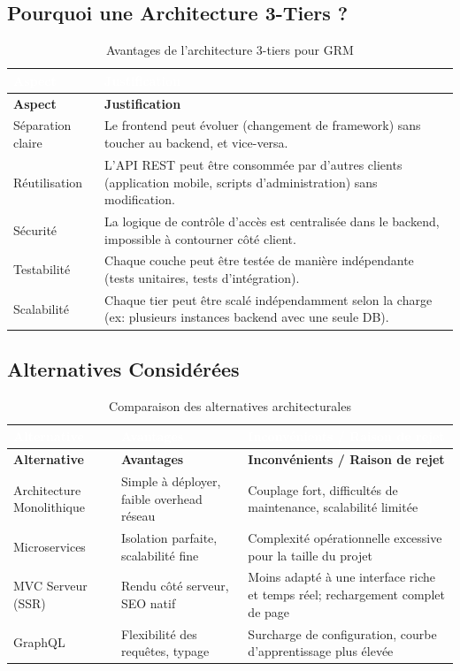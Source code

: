 \documentclass[12pt,a4paper]{report}
\begin{document}
\subsection{Pourquoi une Architecture 3-Tiers ?}

\begin{longtable}{|L{3.5cm}|L{10cm}|}
\caption{Avantages de l'architecture 3-tiers pour GRM} \\
\hline
{}\textcolor{white}{\textbf{Aspect}} & \textcolor{white}{\textbf{Justification}} \\
\hline
\endfirsthead
\hline
\textbf{Aspect} & \textbf{Justification} \\
\hline
\endhead
Séparation claire & Le frontend peut évoluer (changement de framework) sans toucher au backend, et vice-versa. \\
\hline
Réutilisation & L'API REST peut être consommée par d'autres clients (application mobile, scripts d'administration) sans modification. \\
\hline
Sécurité & La logique de contrôle d'accès est centralisée dans le backend, impossible à contourner côté client. \\
\hline
Testabilité & Chaque couche peut être testée de manière indépendante (tests unitaires, tests d'intégration). \\
\hline
Scalabilité & Chaque tier peut être scalé indépendamment selon la charge (ex: plusieurs instances backend avec une seule DB). \\
\hline
\end{longtable}

\subsection{Alternatives Considérées}

\begin{longtable}{|L{3cm}|L{5.5cm}|L{5.5cm}|}
\caption{Comparaison des alternatives architecturales} \\
\hline
{}\textcolor{white}{\textbf{Alternative}} & \textcolor{white}{\textbf{Avantages}} & \textcolor{white}{\textbf{Inconvénients / Raison de rejet}} \\
\hline
\endfirsthead
\hline
\textbf{Alternative} & \textbf{Avantages} & \textbf{Inconvénients / Raison de rejet} \\
\hline
\endhead
Architecture Monolithique & Simple à déployer, faible overhead réseau & Couplage fort, difficultés de maintenance, scalabilité limitée \\
\hline
Microservices & Isolation parfaite, scalabilité fine & Complexité opérationnelle excessive pour la taille du projet \\
\hline
MVC Serveur (SSR) & Rendu côté serveur, SEO natif & Moins adapté à une interface riche et temps réel; rechargement complet de page \\
\hline
GraphQL & Flexibilité des requêtes, typage & Surcharge de configuration, courbe d'apprentissage plus élevée \\
\hline
\end{longtable}
\end{document}
